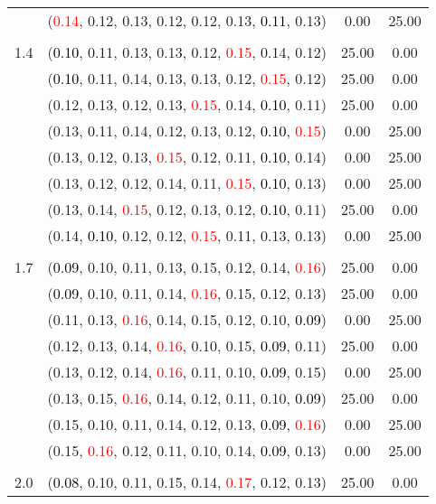 \documentclass[10pt,a4paper]{report}
\begin{document}
\begin{center}
\begin{longtable}{clcc}
			&(\textcolor{red}{0.14}, 0.12, 0.13, 0.12, 0.12, 0.13, \textcolor{black}{0.11}, 0.13)&0.00&25.00\\
		&&&\\
		1.4			&(\textcolor{black}{0.10}, 0.11, 0.13, 0.13, 0.12, \textcolor{red}{0.15}, 0.14, 0.12)&25.00&0.00\\
			&(\textcolor{black}{0.10}, 0.11, 0.14, 0.13, 0.13, 0.12, \textcolor{red}{0.15}, 0.12)&25.00&0.00\\
			&(0.12, 0.13, 0.12, 0.13, \textcolor{red}{0.15}, 0.14, \textcolor{black}{0.10}, 0.11)&25.00&0.00\\
			&(0.13, 0.11, 0.14, 0.12, 0.13, 0.12, \textcolor{black}{0.10}, \textcolor{red}{0.15})&0.00&25.00\\
			&(0.13, 0.12, 0.13, \textcolor{red}{0.15}, 0.12, 0.11, \textcolor{black}{0.10}, 0.14)&0.00&25.00\\
			&(0.13, 0.12, 0.12, 0.14, 0.11, \textcolor{red}{0.15}, \textcolor{black}{0.10}, 0.13)&0.00&25.00\\
			&(0.13, 0.14, \textcolor{red}{0.15}, 0.12, 0.13, 0.12, \textcolor{black}{0.10}, 0.11)&25.00&0.00\\
			&(0.14, \textcolor{black}{0.10}, 0.12, 0.12, \textcolor{red}{0.15}, 0.11, 0.13, 0.13)&0.00&25.00\\
		&&&\\
		1.7			&(\textcolor{black}{0.09}, 0.10, 0.11, 0.13, 0.15, 0.12, 0.14, \textcolor{red}{0.16})&25.00&0.00\\
			&(\textcolor{black}{0.09}, 0.10, 0.11, 0.14, \textcolor{red}{0.16}, 0.15, 0.12, 0.13)&25.00&0.00\\
			&(0.11, 0.13, \textcolor{red}{0.16}, 0.14, 0.15, 0.12, 0.10, \textcolor{black}{0.09})&0.00&25.00\\
			&(0.12, 0.13, 0.14, \textcolor{red}{0.16}, 0.10, 0.15, \textcolor{black}{0.09}, 0.11)&25.00&0.00\\
			&(0.13, 0.12, 0.14, \textcolor{red}{0.16}, 0.11, 0.10, \textcolor{black}{0.09}, 0.15)&0.00&25.00\\
			&(0.13, 0.15, \textcolor{red}{0.16}, 0.14, 0.12, 0.11, 0.10, \textcolor{black}{0.09})&25.00&0.00\\
			&(0.15, 0.10, 0.11, 0.14, 0.12, 0.13, \textcolor{black}{0.09}, \textcolor{red}{0.16})&0.00&25.00\\
			&(0.15, \textcolor{red}{0.16}, 0.12, 0.11, 0.10, 0.14, \textcolor{black}{0.09}, 0.13)&0.00&25.00\\
		&&&\\
		2.0			&(\textcolor{black}{0.08}, 0.10, 0.11, 0.15, 0.14, \textcolor{red}{0.17}, 0.12, 0.13)&25.00&0.00\\

\end{longtable}
\end{center}
\end{document}
